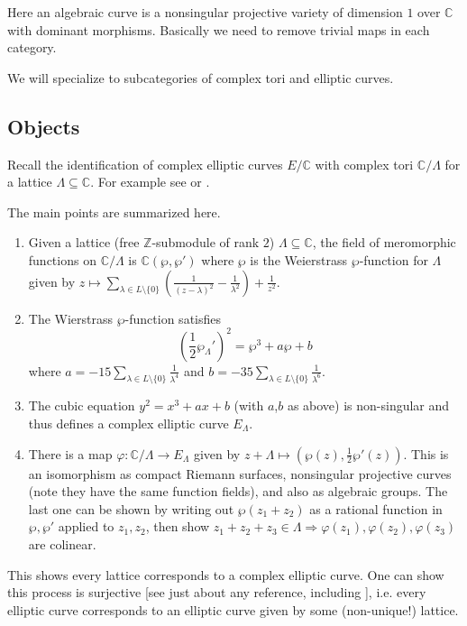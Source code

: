 \documentclass[11pt]{article}
\newcommand{\BB}[1]{\mathbb{#1}} %
\newcommand{\CC}{\BB{C}}
\newcommand{\ZZ}{\BB{Z}}
\theoremstyle{plain}
\theoremstyle{remark}
\begin{document}
\begin{note}
	Here an algebraic curve is a nonsingular projective variety of dimension $1$ over $\CC$ with dominant morphisms. Basically we need to remove trivial maps in each category.
\end{note}

We will specialize to subcategories of complex tori and elliptic curves.

\subsection{Objects}

Recall the identification of complex elliptic curves $E/\CC$ with complex tori $\CC/\Lambda$ for a lattice $\Lambda\subseteq\CC$. For example see \cite[Chapter III Section 3]{milne} or \cite[Chapter 1 Section 4]{diamondshurman}.

The main points are summarized here.
\begin{enumerate}[$\bullet$]
	\item Given a lattice (free $\ZZ$-submodule of rank $2$) $\Lambda\subseteq\CC$, the field of meromorphic functions on $\CC/\Lambda$ is $\CC(\wp,\wp')$ where $\wp$ is the Weierstrass $\wp$-function for $\Lambda$ given by $z\mapsto \sum_{\lambda\in L\setminus\{0\}} \left(\frac{1}{(z-\lambda)^2} - \frac{1}{\lambda^2}\right) + \frac{1}{z^2}$. %

	\item The Wierstrass $\wp$-function satisfies
	$$
		\left(\frac{1}{2}\wp_{\Lambda}'\right)^2 = \wp^3 + a\wp + b
	$$
	where $a = -15 \sum_{\lambda\in L\setminus\{0\}}\frac{1}{\lambda^4}$ and $b = -35 \sum_{\lambda\in L\setminus\{0\}} \frac{1}{\lambda^6}$.

	\item The cubic equation $y^2 = x^3 + ax + b$ (with $a$,$b$ as above) is non-singular and thus defines a complex elliptic curve $E_{\Lambda}$.

	\item There is a map $\varphi:\CC/\Lambda \to E_{\Lambda}$ given by $z+\Lambda \mapsto \left(\wp(z),\frac{1}{2}\wp'(z)\right)$. This is an isomorphism as compact Riemann surfaces, nonsingular projective curves (note they have the same function fields), and also as algebraic groups. The last one can be shown by writing out $\wp(z_1+z_2)$ as a rational function in $\wp,\wp'$ applied to $z_1,z_2$, then show $z_1+z_2+z_3\in\Lambda \Rightarrow \varphi(z_1),\varphi(z_2),\varphi(z_3)$ are colinear.
\end{enumerate}
This shows every lattice corresponds to a complex elliptic curve. One can show this process is surjective [see just about any reference, including \cite{diamondshurman}], i.e. every elliptic curve corresponds to an elliptic curve given by some (non-unique!) lattice.
\end{document}
